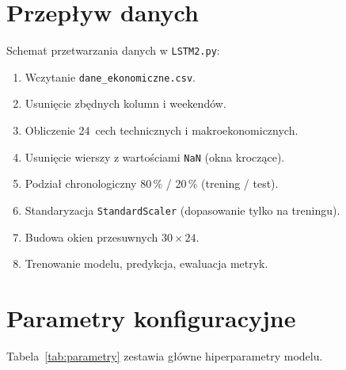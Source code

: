 \documentclass[12pt,a4paper]{report}
\begin{document}
\section{Przepływ danych}



Schemat przetwarzania danych w \texttt{LSTM2.py}:



\begin{enumerate}

    \item Wczytanie \texttt{dane\_ekonomiczne.csv}.

    \item Usunięcie zbędnych kolumn i weekendów.

    \item Obliczenie 24~cech technicznych i makroekonomicznych.

    \item Usunięcie wierszy z wartościami \texttt{NaN} (okna kroczące).

    \item Podział chronologiczny 80\,\% / 20\,\% (trening / test).

    \item Standaryzacja \texttt{StandardScaler} (dopasowanie tylko na treningu).

    \item Budowa okien przesuwnych $30 \times 24$.

    \item Trenowanie modelu, predykcja, ewaluacja metryk.

\end{enumerate}



\section{Parametry konfiguracyjne}



Tabela~\ref{tab:parametry} zestawia główne hiperparametry modelu.
\end{document}
